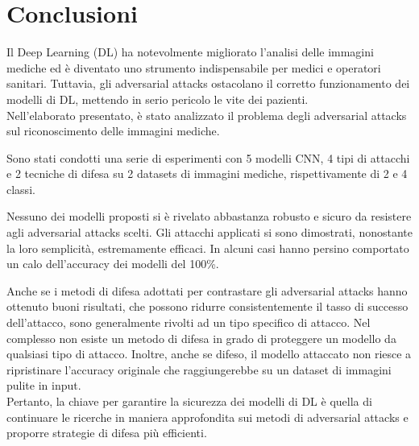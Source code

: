 \chapter{Conclusioni}

Il Deep Learning (DL) ha notevolmente migliorato l'analisi delle immagini mediche ed è diventato uno strumento indispensabile per medici e operatori sanitari. Tuttavia, gli adversarial attacks ostacolano il corretto funzionamento dei modelli di DL, mettendo in serio pericolo le vite dei pazienti.\\

Nell'elaborato presentato, è stato analizzato il problema degli adversarial attacks sul riconoscimento delle immagini mediche. 

Sono stati condotti una serie di esperimenti con 5 modelli CNN, 4 tipi di attacchi e 2 tecniche di difesa su 2 datasets di immagini mediche, rispettivamente di 2 e 4 classi.

Nessuno dei modelli proposti si è rivelato abbastanza robusto e sicuro da resistere agli adversarial attacks scelti.
Gli attacchi applicati si sono dimostrati, nonostante la loro semplicità, estremamente efficaci. In alcuni casi hanno persino comportato un calo dell'accuracy dei modelli del 100\%.
 
Anche se i metodi di difesa adottati per contrastare gli adversarial attacks hanno ottenuto buoni risultati, che possono ridurre consistentemente il tasso di successo dell'attacco, sono generalmente rivolti ad un tipo specifico di attacco. 
Nel complesso non esiste un metodo di difesa in grado di proteggere un modello da qualsiasi tipo di attacco.
Inoltre, anche se difeso, il modello attaccato non riesce a ripristinare l'accuracy originale che raggiungerebbe su un dataset di immagini pulite in input.\\

Pertanto, la chiave per garantire la sicurezza dei modelli di DL è quella di continuare le ricerche in maniera approfondita sui metodi di adversarial attacks e proporre strategie di difesa più efficienti.
